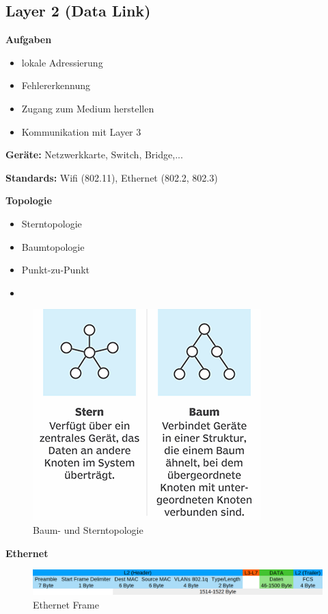 \subsection{Layer 2 (Data Link)}
\textbf{Aufgaben}
\begin{itemize}
	\item lokale Adressierung
	\item Fehlererkennung
	\item Zugang zum Medium herstellen
	\item Kommunikation mit Layer 3
\end{itemize}

\textbf{Geräte:} Netzwerkkarte, Switch, Bridge,...

\textbf{Standards:} Wifi (802.11), Ethernet (802.2, 802.3)

\textbf{Topologie}
\begin{itemize}
	\item Sterntopologie
	\item Baumtopologie
	\item Punkt-zu-Punkt
	\item[] 
\end{itemize}
\begin{figure}[H]
	\centering
	\includegraphics[width=0.6\linewidth]{figures/topologiearten.png}
	\caption{Baum- und Sterntopologie}
	\label{fig:nettopo}
\end{figure}

\textbf{Ethernet}
\begin{figure}[H]
	\centering
	\includegraphics[width=1.0\linewidth]{figures/ethheader.png}
	\caption{Ethernet Frame}
	\label{fig:ethheader}
\end{figure}

